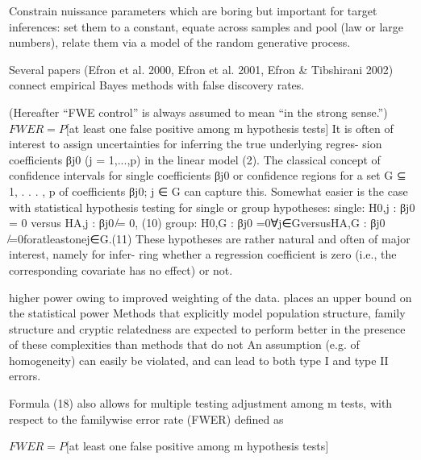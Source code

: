 \documentclass{article}
\begin{document}
Constrain nuissance parameters which are boring but important for target inferences: set them to a constant, equate across samples and pool (law or large numbers), relate them via a model of the random generative process. 

Several papers (Efron et al. 2000, Efron et al. 2001, Efron & Tibshirani 2002) connect empirical Bayes methods with false discovery rates.

 (Hereafter “FWE control” is always assumed to mean “in the strong sense.”)
$FWER = P[$at least one false positive among m hypothesis tests$]$
It is often of interest to assign uncertainties for inferring the true underlying regres- sion coefficients βj0 (j = 1,...,p) in the linear model (2). The classical concept of confidence intervals for single coefficients βj0 or confidence regions for a set G ⊆ {1, . . . , p} of coefficients {βj0; j ∈ G} can capture this. Somewhat easier is the case with statistical hypothesis testing for single or group hypotheses:
single: H0,j : βj0 = 0 versus HA,j : βj0 ̸= 0, (10) group: H0,G : βj0 =0∀j∈GversusHA,G : βj0 ̸=0foratleastonej∈G.(11)
These hypotheses are rather natural and often of major interest, namely for infer- ring whether a regression coefficient is zero (i.e., the corresponding covariate has no effect) or not.

higher power owing to improved weighting of the data.
places an upper bound on the statistical power
Methods that explicitly model population structure, family structure and cryptic relatedness are expected to perform better in the presence of these complexities than methods that do not
An assumption (e.g. of homogeneity) can easily be violated, and can lead to both type I and type II errors.

Formula (18) also allows for multiple testing adjustment among m tests, with respect to the familywise error rate (FWER) defined as

$FWER = P[$at least one false positive among m hypothesis tests$]$
\end{document}
